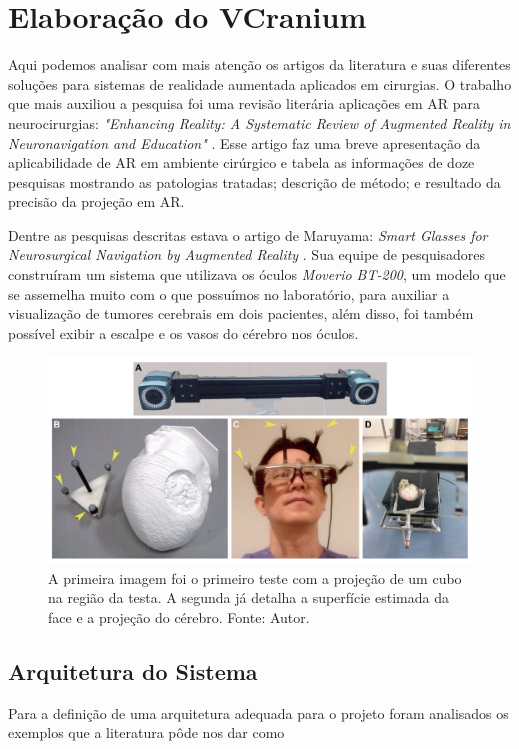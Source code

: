 \section{Elaboração do VCranium}

Aqui podemos analisar com mais atenção os artigos da literatura e suas diferentes soluções para sistemas de realidade aumentada aplicados em cirurgias. O trabalho que mais auxiliou a pesquisa foi uma revisão literária aplicações em AR para neurocirurgias: \textit{"Enhancing Reality: A Systematic Review of Augmented Reality in Neuronavigation and Education"} \cite{enhancedvision}. Esse artigo faz uma breve apresentação da aplicabilidade de AR em ambiente cirúrgico e tabela as informações de doze pesquisas mostrando as patologias tratadas; descrição de método; e resultado da precisão da projeção em AR.

Dentre as pesquisas descritas estava o artigo de Maruyama: \textit{Smart Glasses for Neurosurgical Navigation by Augmented Reality} \cite{Maruyama2018}. Sua equipe de pesquisadores construíram um sistema que utilizava os óculos \textit{Moverio BT-200}, um modelo que se assemelha muito com o que possuímos no laboratório, para auxiliar a visualização de tumores cerebrais em dois pacientes, além disso, foi também possível exibir a escalpe e os vasos do cérebro nos óculos.

\begin{figure}[ht]
    \centering
    \includegraphics[width=.65\linewidth]{figuras/Maruyama.png}
    \caption{A primeira imagem foi o primeiro teste com a projeção de um cubo na região da testa. A segunda já detalha a superfície estimada da face e a projeção do cérebro. Fonte: Autor.}
    \label{fig:maruyama}
\end{figure}

\subsection{Arquitetura do Sistema}

Para a definição de uma arquitetura adequada para o projeto foram analisados os exemplos que a literatura pôde nos dar como

